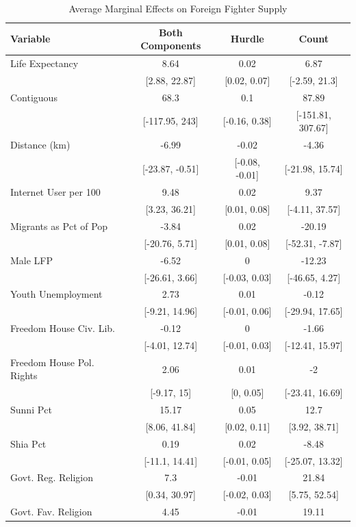 \documentclass[12pt]{article}
\begin{document}
\begin{table}[!p]
	\footnotesize
	\centering
	\caption{Average Marginal Effects on Foreign Fighter Supply} 	\label{tab:appeffects}
	\begin{tabular}{l ccc}
		\toprule
		Variable & \multicolumn{1}{c}{Both Components} & \multicolumn{1}{c}{Hurdle} & \multicolumn{1}{c}{Count} \\ 
		\midrule
Life Expectancy & 8.64 & 0.02 & 6.87 \\ 
& [2.88, 22.87] & [0.02, 0.07] & [-2.59, 21.3] \\ 
Contiguous & 68.3 & 0.1 & 87.89 \\ 
& [-117.95, 243] & [-0.16, 0.38] & [-151.81, 307.67] \\ 
Distance (km) & -6.99 & -0.02 & -4.36 \\ 
& [-23.87, -0.51] & [-0.08, -0.01] & [-21.98, 15.74] \\ 
Internet User per 100 & 9.48 & 0.02 & 9.37 \\ 
& [3.23, 36.21] & [0.01, 0.08] & [-4.11, 37.57] \\ 
Migrants as Pct of Pop & -3.84 & 0.02 & -20.19 \\ 
& [-20.76, 5.71] & [0.01, 0.08] & [-52.31, -7.87] \\ 
Male LFP & -6.52 & 0 & -12.23 \\ 
& [-26.61, 3.66] & [-0.03, 0.03] & [-46.65, 4.27] \\ 
Youth Unemployment & 2.73 & 0.01 & -0.12 \\ 
& [-9.21, 14.96] & [-0.01, 0.06] & [-29.94, 17.65] \\ 
Freedom House Civ. Lib. & -0.12 & 0 & -1.66 \\ 
& [-4.01, 12.74] & [-0.01, 0.03] & [-12.41, 15.97] \\ 
Freedom House Pol. Rights & 2.06 & 0.01 & -2 \\ 
& [-9.17, 15] & [0, 0.05] & [-23.41, 16.69] \\ 
Sunni Pct & 15.17 & 0.05 & 12.7 \\ 
& [8.06, 41.84] & [0.02, 0.11] & [3.92, 38.71] \\ 
Shia Pct & 0.19 & 0.02 & -8.48 \\ 
& [-11.1, 14.41] & [-0.01, 0.05] & [-25.07, 13.32] \\ 
Govt. Reg. Religion & 7.3 & -0.01 & 21.84 \\ 
& [0.34, 30.97] & [-0.02, 0.03] & [5.75, 52.54] \\ 
Govt. Fav. Religion & 4.45 & -0.01 & 19.11 \\ 

\end{tabular}
\end{table}
\end{document}
